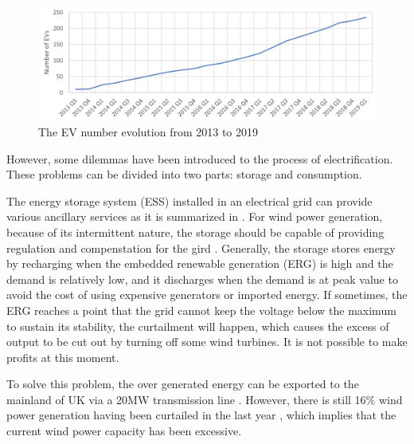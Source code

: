 \documentclass[12pt,a4paper]{report}
\begin{document}
        \begin{figure}[ht]
            \centerline{\includegraphics[scale=1]{evnumber}}
            \caption{The EV number evolution from 2013 to 2019}
            \label{fig_EV_number}
        \end{figure}

        However, some dilemmas have been introduced to the process of electrification. 
        These problems can be divided into two parts: storage and consumption.

        The energy storage system (ESS) installed in an electrical grid can provide various ancillary services as it is summarized in \cite{paper:Lawder2014}. 
        For wind power generation, because of its intermittent nature, the storage should be capable of providing regulation and compenstation for the gird \cite{paper:gridrisk} \cite{paper:gridscenarios}.
        Generally, the storage stores energy by recharging when the embedded renewable generation (ERG) is high and the demand is relatively low, 
        and it discharges when the demand is at peak value to avoid the cost of using expensive generators or imported energy. 
        If sometimes, the ERG reaches a point that the grid cannot keep the voltage below the maximum to sustain its stability, 
        the curtailment will happen, which causes the excess of output to be cut out by turning off some wind turbines. It is not possible to make profits 
        at this moment. 
        
        To solve this problem, the over generated energy can be exported to the mainland of UK via a 20MW transmission line \cite{book:Orkneypowerexport}. 
        However, there is still 16\% wind power generation having been curtailed in the last year \cite{report:OrkneyAudit}, which implies that the current wind power capacity has been excessive.
        
\end{document}
